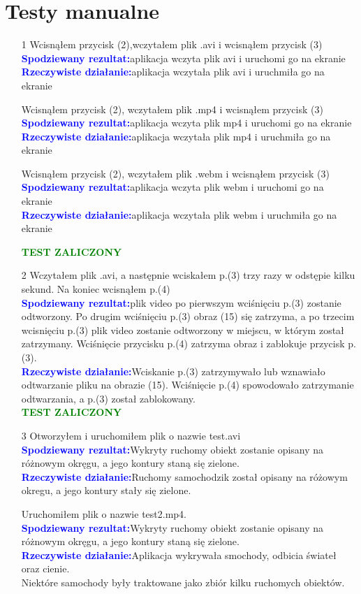 \documentclass[11pt,a4paper]{article}
\newcommand{\testA}{\textcolor{blue}{\textbf{Spodziewany rezultat:\quad}}}
\newcommand{\testB}{\textcolor{blue}{\textbf{Rzeczywiste działanie:\quad}}}
\newcommand{\testT}{\textcolor{green}{\large{\textbf{TEST ZALICZONY}}}}
\begin{document}
\section{Testy manualne}
\begin{enumerate}
\item[1] Wcisnąłem przycisk (2),wczytałem plik .avi i wcisnąłem przycisk (3)\\
\testA aplikacja wczyta plik avi i uruchomi go na ekranie\\
\testB aplikacja wczytała plik avi i uruchmiła go na ekranie

Wcisnąłem przycisk (2), wczytałem plik .mp4 i wcisnąłem przycisk (3)\\
\testA aplikacja wczyta plik mp4 i uruchomi go na ekranie\\
\testB aplikacja wczytała plik mp4 i uruchmiła go na ekranie

Wcisnąłem przycisk (2), wczytałem plik .webm i wcisnąłem przycisk (3)\\
\testA aplikacja wczyta plik webm i uruchomi go na ekranie\\
\testB aplikacja wczytała plik webm i uruchmiła go na ekranie

\testT

\item[2] Wczytałem plik .avi, a następnie wciskałem p.(3) trzy razy w odstępie kilku sekund. Na koniec wcisnąłem p.(4)\\
\testA plik video po pierwszym wciśnięciu p.(3) zostanie odtworzony. Po drugim wciśnięciu p.(3) obraz (15) się zatrzyma, a po trzecim wcisnięciu p.(3) plik video zostanie odtworzony w miejscu, w którym został zatrzymany. Wciśnięcie przycisku p.(4) zatrzyma obraz i zablokuje przycisk p.(3).\\
\testB Wciskanie p.(3) zatrzymywało lub wznawiało odtwarzanie pliku na obrazie (15). Wciśnięcie p.(4) spowodowało zatrzymanie odtwarzania, a p.(3) został zablokowany.\\
\testT
\item[3] Otworzyłem i uruchomiłem plik o nazwie test.avi\\
\testA Wykryty ruchomy obiekt zostanie opisany na różnowym okręgu, a jego kontury staną się zielone.\\
\testB Ruchomy samochodzik został opisany na różowym okregu, a jego kontury stały się zielone.

Uruchomiłem plik o nazwie test2.mp4.\\
\testA Wykryty ruchomy obiekt zostanie opisany na różnowym okręgu, a jego kontury staną się zielone.\\
\testB Aplikacja wykrywała smochody, odbicia świateł  oraz cienie.\\ Niektóre samochody były traktowane jako zbiór kilku ruchomych obiektów.


\end{enumerate}
\end{document}
